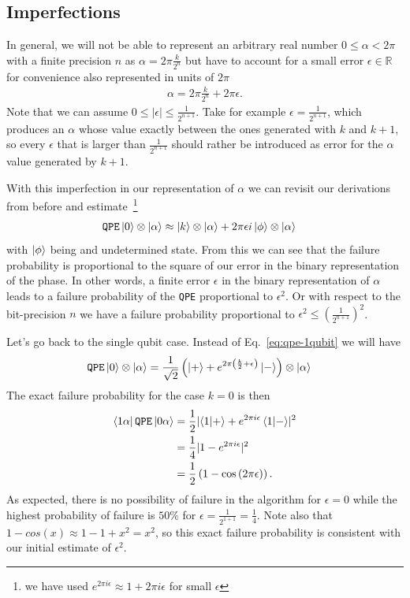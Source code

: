 \subsection{Imperfections}
In general, we will not be able to represent an arbitrary real number $0 \leq \alpha < 2\pi$ with a finite precision $n$ as $\alpha = 2\pi \frac{k}{2^n}$ but have to account for a small error $\epsilon \in \mathbb{R}$ for convenience also represented in units of $2\pi$
\begin{align}
    \alpha = 2\pi \frac{k}{2^n} + 2\pi\epsilon.
\end{align}
Note that we can assume $0 \leq |\epsilon| \leq \frac{1}{2^{n+1}}$. Take for example $\epsilon=\frac{1}{2^{n+1}}$, which produces an $\alpha$ whose value exactly between the ones generated with $k$ and $k+1$, so every $\epsilon$ that is larger than $\frac{1}{2^{n+1}}$ should rather be introduced as error for the $\alpha$ value generated by $k+1$.

With this imperfection in our representation of $\alpha$ we can revisit our derivations from before and estimate~\footnote{we have used $e^{2\pi i \epsilon} \approx 1 + 2\pi i \epsilon$ for small $\epsilon$}
\begin{align}
    \texttt{QPE}\ket{0}\otimes\ket{\alpha}
    &\approx \ket{k}\otimes\ket{\alpha} + 2\pi \epsilon i \ket{\phi} \otimes \ket{\alpha}
\end{align}
with $\ket{\phi}$ being and undetermined state.
From this we can see that the failure probability is proportional to the square of our error in the binary representation of the phase. In other words, a finite error $\epsilon$ in the binary representation of $\alpha$ leads to a failure probability of the \texttt{QPE} proportional to $\epsilon^2$. Or with respect to the bit-precision $n$ we have a failure probability proportional to $\epsilon^2 \leq \left(\frac{1}{2^{n+1}}\right)^2$.

Let's go back to the single qubit case. Instead of Eq.~\eqref{eq:qpe-1qubit} we will have
\begin{align}
    \texttt{QPE}\ket{0}\otimes\ket{\alpha} &= \frac{1}{\sqrt{2}}\left(\ket{+} + e^{2\pi\left(\frac{k}{2} + \epsilon\right)}\ket{-}\right) \otimes\ket{\alpha}
\end{align}
The exact failure probability for the case $k=0$ is then
\begin{align}
   \bra{1\alpha}\texttt{QPE}\ket{0\alpha} &=\frac{1}{2} \lvert\braket{1}{+} + e^{2\pi i \epsilon}\braket{1}{-}\rvert^2 \\
   & = \frac{1}{4} \lvert 1 - e^{2\pi i \epsilon} \rvert^2 \\
   & = \frac{1}{2}\left(1-\cos\left(2\pi\epsilon\right)\right).
\end{align}
As expected, there is no possibility of failure in the algorithm for $\epsilon=0$ while the highest probability of failure is $50\%$ for $\epsilon=\frac{1}{2^{1+1}}=\frac{1}{4}$.
Note also that $1-cos(x) \approx 1 - 1 + x^2 = x^2$, so this exact failure probability is consistent with our initial estimate of $\epsilon^2$.
